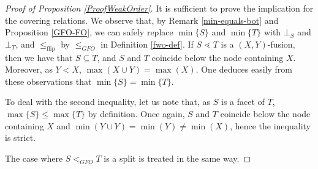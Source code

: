 \documentclass{article}
\theoremstyle{plain}
\theoremstyle{definition}
\newcommand{\set}[1]{\{#1\}}
\begin{document}
\begin{proof}[Proof of Proposition \ref{ProofWeakOrder}]
It is sufficient to prove the implication for the covering relations.
We observe that, by Remark \ref{min-equals-bot} and Proposition \ref{GFO-FO}, we can safely replace $\min\set{S}$ and $\min\set{T}$ with $\bot_S$ and $\bot_T$, and $\leq_{\operatorname{flip}}$ by $\leq_{\mathit{GFO}}$ in Definition \ref{fwo-def}.
If $S \lessdot T$ is a $(X,Y)$-fusion, then we have that $S \subseteq T$, and
 $S$ and $T$ coincide below the node containing $X$. Moreover, as $Y<X$, $\max(X \cup Y) = \max(X)$. One deduces easily from these observations that $\min\set{S}=\min\set{T}$.

To deal with the second inequality, let us note that, as $S$ is a facet of $T$, $\max\set{S} \leq \max\set{T}$ by definition. Once again, $S$ and $T$ coincide below the node containing $X$ and $\min(Y \cup Y)=\min(Y) \neq \min(X)$, hence the inequality is strict.

The case where $S <_{\mathit{GFO}} T$ is a split is treated in the same way.
\end{proof}
\end{document}
